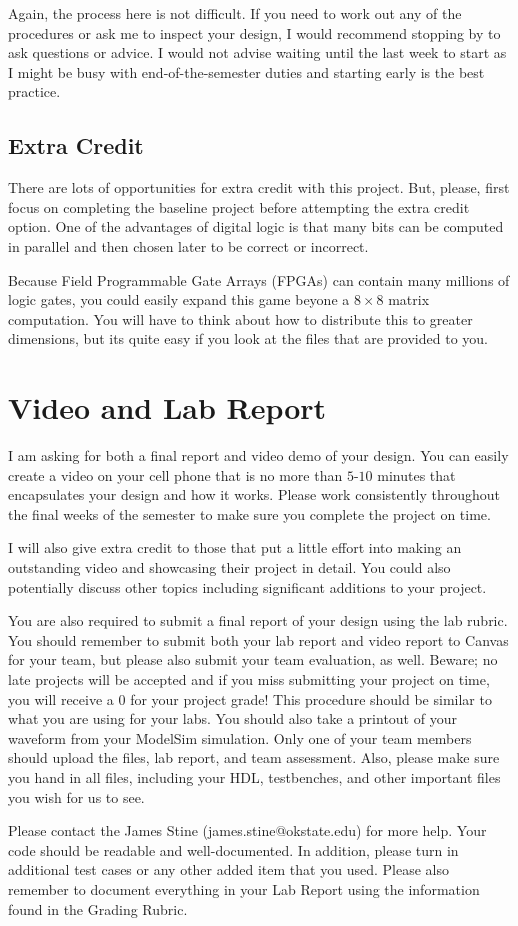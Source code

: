 \documentclass{article}
\begin{document}
Again, the process here is not difficult.  If you need to work out any
of the procedures or ask me to inspect your design, I would recommend
stopping by to ask questions or advice.  I would not advise waiting
until the last week to start as I might be busy with
end-of-the-semester duties and starting early is the best practice.

\subsection{Extra Credit}

There are lots of opportunities for extra credit with this project.
But, please, first focus on completing the baseline project before
attempting the extra credit option.  One of the advantages of digital
logic is that many bits can be computed in parallel and then chosen
later to be correct or incorrect.

Because Field Programmable Gate Arrays
(FPGAs) can contain many millions of logic gates, you could
easily expand this game beyone a $8 \times 8$ matrix computation.  You
will have to think about how to distribute this to greater dimensions,
but its quite easy if you look at the files that are provided to you.

\section{Video and Lab Report}

I am asking for
both a final report and video demo of your design.  You can easily
create a video on your cell phone that is no more than $5$-$10$ minutes
that encapsulates your design and how it works.  Please work
consistently throughout the final weeks of the semester to make sure
you complete the project on time.

I will also give extra credit to those that put a little effort into
making an outstanding video and showcasing their project in detail.
You could also potentially discuss other topics including significant
additions to your project.

You are also required to submit a final report of your design using
the lab rubric.  You should remember to submit both your lab report
and video report to Canvas for
your team, but please also submit your team evaluation, as well.
Beware; no
late projects will be accepted and if you miss submitting your project
on time, you will receive a $0$ for your project grade!  This
procedure should be similar to what you are using for your labs.
You should also take a printout of your waveform 
from your ModelSim simulation.  
Only one of your team members should upload
the files, lab report, and team assessment.  Also, please make sure you
hand in all files, including your HDL, testbenches, and other
important files you wish for us to see.

Please contact
the James Stine
(james.stine@okstate.edu) 
for more help.  Your
code should be
readable and well-documented. In addition, please turn in additional
test cases or any other added item that you used. 
Please also remember to document everything in your Lab Report using
the information found in the Grading Rubric.

   


\end{document}
